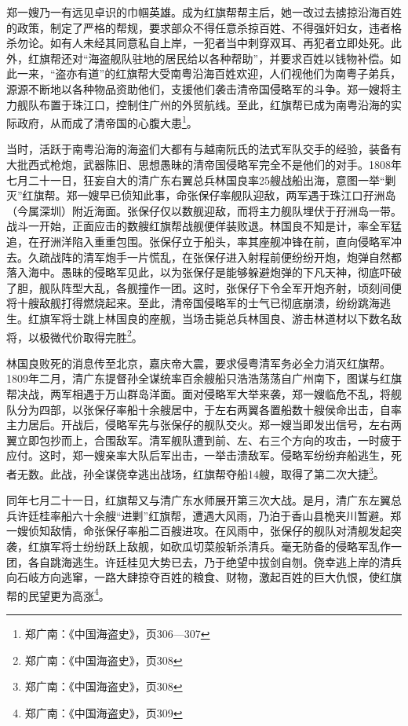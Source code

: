 郑一嫂乃一有远见卓识的巾帼英雄。成为红旗帮帮主后，她一改过去掳掠沿海百姓的政策，制定了严格的帮规，要求部众不得任意杀掠百姓、不得强奸妇女，违者格杀勿论。如有人未经其同意私自上岸，一犯者当中刺穿双耳、再犯者立即处死。此外，红旗帮还对“海盗舰队驻地的居民给以各种帮助”，并要求百姓以钱物补偿。如此一来，“盗亦有道”的红旗帮大受南粤沿海百姓欢迎，人们视他们为南粤子弟兵，源源不断地以各种物品资助他们，支援他们袭击清帝国侵略军的斗争。郑一嫂将主力舰队布置于珠江口，控制住广州的外贸航线。至此，红旗帮已成为南粤沿海的实际政府，从而成了清帝国的心腹大患\footnote{郑广南：《中国海盗史》，页306—307}。

当时，活跃于南粤沿海的海盗们大都有与越南阮氏的法式军队交手的经验，装备有大批西式枪炮，武器陈旧、思想愚昧的清帝国侵略军完全不是他们的对手。1808年七月二十一日，狂妄自大的清广东右翼总兵林国良率25艘战船出海，意图一举“剿灭”红旗帮。郑一嫂早已侦知此事，命张保仔率舰队迎敌，两军遇于珠江口孖洲岛（今属深圳）附近海面。张保仔仅以数舰迎敌，而将主力舰队埋伏于孖洲岛一带。战斗一开始，正面应击的数艘红旗帮战舰便佯装败退。林国良不知是计，率全军猛追，在孖洲洋陷入重重包围。张保仔立于船头，率其座舰冲锋在前，直向侵略军冲去。久疏战阵的清军炮手一片慌乱，在张保仔进入射程前便纷纷开炮，炮弹自然都落入海中。愚昧的侵略军见此，以为张保仔是能够躲避炮弹的下凡天神，彻底吓破了胆，舰队阵型大乱，各舰撞作一团。这时，张保仔下令全军开炮齐射，顷刻间便将十艘敌舰打得燃烧起来。至此，清帝国侵略军的士气已彻底崩溃，纷纷跳海逃生。红旗军将士跳上林国良的座舰，当场击毙总兵林国良、游击林道材以下数名敌将，以极微代价取得完胜\footnote{郑广南：《中国海盗史》，页308}。

林国良败死的消息传至北京，嘉庆帝大震，要求侵粤清军务必全力消灭红旗帮。1809年二月，清广东提督孙全谋统率百余艘船只浩浩荡荡自广州南下，图谋与红旗帮决战，两军相遇于万山群岛洋面。面对侵略军大举来袭，郑一嫂临危不乱，将舰队分为四部，以张保仔率船十余艘居中，于左右两翼各置船数十艘侯命出击，自率主力居后。开战后，侵略军先与张保仔的舰队交火。郑一嫂当即发出信号，左右两翼立即包抄而上，合围敌军。清军舰队遭到前、左、右三个方向的攻击，一时疲于应付。这时，郑一嫂亲率大队后军出击，一举击溃敌军。侵略军纷纷弃船逃生，死者无数。此战，孙全谋侥幸逃出战场，红旗帮夺船14艘，取得了第二次大捷\footnote{郑广南：《中国海盗史》，页308}。

同年七月二十一日，红旗帮又与清广东水师展开第三次大战。是月，清广东左翼总兵许廷桂率船六十余艘“进剿”红旗帮，遭遇大风雨，乃泊于香山县桅夹川暂避。郑一嫂侦知敌情，命张保仔率船二百艘进攻。在风雨中，张保仔的舰队对清舰发起突袭，红旗军将士纷纷跃上敌舰，如砍瓜切菜般斩杀清兵。毫无防备的侵略军乱作一团，各自跳海逃生。许廷桂见大势已去，乃于绝望中拔剑自刎。侥幸逃上岸的清兵向石岐方向逃窜，一路大肆掠夺百姓的粮食、财物，激起百姓的巨大仇恨，使红旗帮的民望更为高涨\footnote{郑广南：《中国海盗史》，页309}。

